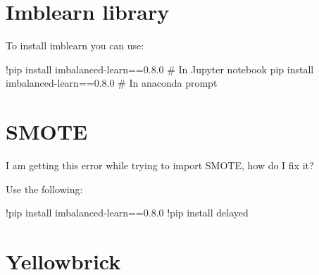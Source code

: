 	\section{Imblearn library}
To install imblearn you can use:
	\begin{code}[\codenumbering]{}
		\codeitemnonumber !pip install imbalanced-learn==0.8.0 \# In Jupyter notebook
		\codeitemnonumber pip install imbalanced-learn==0.8.0 \# In anaconda prompt
	\end{code}


	\section{SMOTE}
I am getting this error while trying to import SMOTE, how do I fix it?

\noindent{}

Use the following:
	\begin{code}[\codenumbering]{}
		\codeitemnonumber !pip install imbalanced-learn==0.8.0
		\codeitemnonumber !pip install delayed
	\end{code}


	\section{Yellowbrick}
